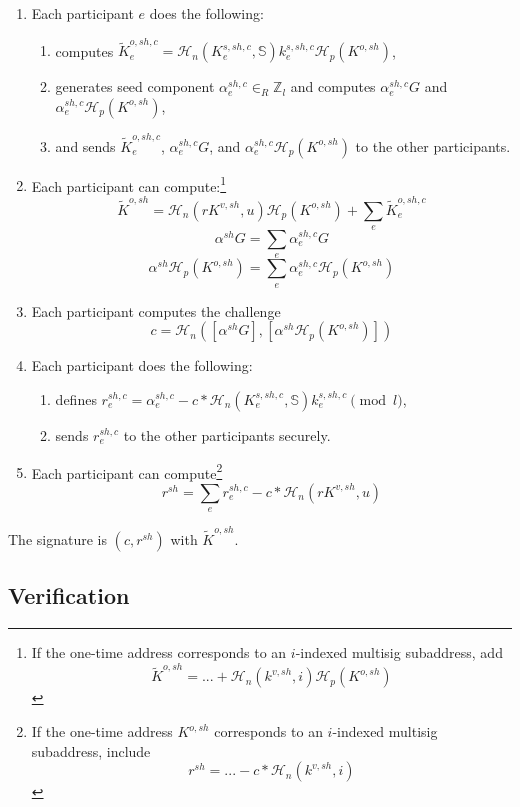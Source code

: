 \begin{enumerate}
    \item Each participant $e$ does the following:
    \begin{enumerate}
        \item computes $\tilde{K}^{o,sh,c}_{e} = \mathcal{H}_n(K^{s,sh,c}_e,\mathbb{S}) k^{s,sh,c}_e \mathcal{H}_p(K^{o,sh})$,
        \item generates seed component $\alpha^{sh,c}_e \in_R \mathbb{Z}_l$ and computes $\alpha^{sh,c}_e G$ and $\alpha^{sh,c}_e \mathcal{H}_p(K^{o,sh})$,
        \item and sends $\tilde{K}^{o,sh,c}_{e}$, $\alpha^{sh,c}_e G$, and $\alpha^{sh,c}_e \mathcal{H}_p(K^{o,sh})$ to the other participants.
    \end{enumerate}
    \item Each participant can compute:\footnote{If the one-time address corresponds to an $i$-indexed multisig subaddress, add
    \[ \tilde{K}^{o,sh} = ... + \mathcal{H}_n(k^{v,sh},i) \mathcal{H}_p(K^{o,sh})\]}
    \[ \tilde{K}^{o,sh} = \mathcal{H}_n(r K^{v,sh}, u) \mathcal{H}_p(K^{o,sh}) + \sum_e \tilde{K}^{o,sh,c}_{e} \]
    \[ \alpha^{sh} G = \sum_e \alpha^{sh,c}_{e} G\]
    \[ \alpha^{sh} \mathcal{H}_p(K^{o,sh}) = \sum_e \alpha^{sh,c}_{e} \mathcal{H}_p(K^{o,sh})\]
    \item Each participant computes the challenge
    \[ c = \mathcal{H}_n([\alpha^{sh} G],[\alpha^{sh} \mathcal{H}_p(K^{o,sh})])\]
    \item Each participant does the following:
    \begin{enumerate}
        \item defines $r^{sh,c}_e = \alpha^{sh,c}_e - c*\mathcal{H}_n(K^{s,sh,c}_e,\mathbb{S}) k^{s,sh,c}_e \pmod l$,
        \item sends $r^{sh,c}_e$ to the other participants securely.
    \end{enumerate}
    \item Each participant can compute\footnote{If the one-time address $K^{o,sh}$ corresponds to an $i$-indexed multisig subaddress, include
    \[ r^{sh} = ... - c*\mathcal{H}_n(k^{v,sh},i)\]}
    \[ r^{sh} = \sum_e r^{sh,c}_e - c*\mathcal{H}_n(r K^{v,sh}, u)\]
\end{enumerate}

The signature is $(c,r^{sh})$ with $\tilde{K}^{o,sh}$.

\subsection*{Verification}

